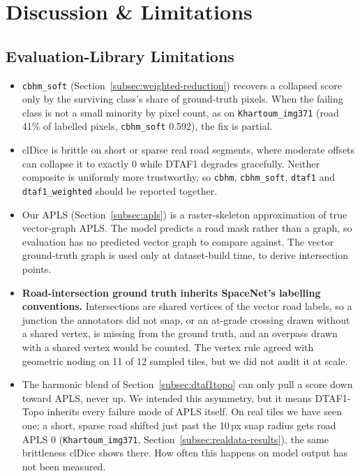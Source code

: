 \section{Discussion \& Limitations}
\label{sec:discussion}

\subsection{Evaluation-Library Limitations}

\begin{itemize}
  \item \texttt{cbhm\_soft} (Section~\ref{subsec:weighted-reduction}) recovers a collapsed score
    only by the surviving class's share of ground-truth pixels. When the failing class is not a
    small minority by pixel count, as on \texttt{Khartoum\_img371} (road 41\% of labelled pixels,
    \texttt{cbhm\_soft} 0.592), the fix is partial.
  \item clDice is brittle on short or sparse real road segments, where moderate offsets can
    collapse it to exactly 0 while DTAF1 degrades gracefully. Neither composite is uniformly more
    trustworthy, so \texttt{cbhm}, \texttt{cbhm\_soft}, \texttt{dtaf1} and
    \texttt{dtaf1\_weighted} should be reported together.
  \item Our APLS (Section~\ref{subsec:apls}) is a raster-skeleton approximation of true
    vector-graph APLS. The model predicts a road mask rather than a graph, so evaluation has no
    predicted vector graph to compare against. The vector ground-truth graph is used only at
    dataset-build time, to derive intersection points.
  \item \textbf{Road-intersection ground truth inherits SpaceNet's labelling conventions.}
    Intersections are shared vertices of the vector road labels, so a junction the annotators did
    not snap, or an at-grade crossing drawn without a shared vertex, is missing from the ground
    truth, and an overpass drawn with a shared vertex would be counted. The vertex rule agreed with
    geometric noding on 11 of 12 sampled tiles, but we did not audit it at scale.
  \item The harmonic blend of Section~\ref{subsec:dtaf1topo} can only pull a score down toward
    APLS, never up. We intended this asymmetry, but it means DTAF1-Topo inherits every failure mode
    of APLS itself. On real tiles we have seen one: a short, sparse road shifted just past the
    10\,px snap radius gets road APLS 0 (\texttt{Khartoum\_img371},
    Section~\ref{subsec:realdata-results}), the same brittleness clDice shows there. How often
    this happens on model output has not been measured.
\end{itemize}

